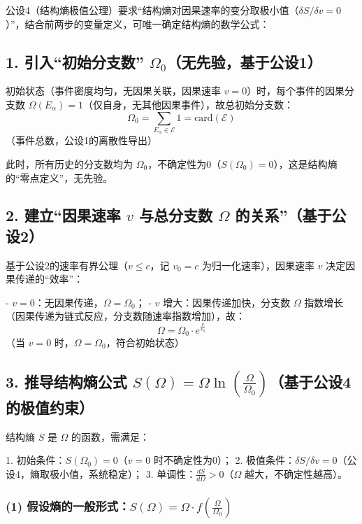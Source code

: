 \documentclass{article}
\begin{document}
公设4（结构熵极值公理）要求“结构熵对因果速率的变分取极小值（\( \delta S/\delta v = 0 \)）”，结合前两步的变量定义，可唯一确定结构熵的数学公式：

\subsection*{1. 引入“初始分支数” \( \Omega_0 \)（无先验，基于公设1）}

初始状态（事件密度均匀，无因果关联，因果速率 \( v=0 \)）时，每个事件的因果分支数 \( \Omega(E_\alpha) = 1 \)（仅自身，无其他因果事件），故总初始分支数：
\[
\Omega_0 = \sum_{E_\alpha \in \mathcal{E}} 1 = \text{card}(\mathcal{E})
\]
（事件总数，公设1的离散性导出）

此时，所有历史的分支数均为 \( \Omega_0 \)，不确定性为0（\( S(\Omega_0) = 0 \)），这是结构熵的“零点定义”，无先验。

\subsection*{2. 建立“因果速率 \( v \) 与总分支数 \( \Omega \) 的关系”（基于公设2）}

基于公设2的速率有界公理（\( v \leq c \)，记 \( v_0 = c \) 为归一化速率），因果速率 \( v \) 决定因果传递的“效率”：

- \( v=0 \)：无因果传递，\( \Omega = \Omega_0 \)；
- \( v \) 增大：因果传递加快，分支数 \( \Omega \) 指数增长（因果传递为链式反应，分支数随速率指数增加），故：
\[
\Omega = \Omega_0 \cdot e^{\frac{v}{v_0}}
\]
（当 \( v=0 \) 时，\( \Omega = \Omega_0 \)，符合初始状态）

\subsection*{3. 推导结构熵公式 \( S(\Omega) = \Omega \ln\left(\frac{\Omega}{\Omega_0}\right) \)（基于公设4的极值约束）}

结构熵 \( S \) 是 \( \Omega \) 的函数，需满足：

1. 初始条件：\( S(\Omega_0) = 0 \)（\( v=0 \) 时不确定性为0）；
2. 极值条件：\( \delta S/\delta v = 0 \)（公设4，熵取极小值，系统稳定）；
3. 单调性：\( \frac{dS}{d\Omega} > 0 \)（\( \Omega \) 越大，不确定性越高）。

\subsubsection*{(1) 假设熵的一般形式：\( S(\Omega) = \Omega \cdot f\left(\frac{\Omega}{\Omega_0}\right) \)}
\end{document}
